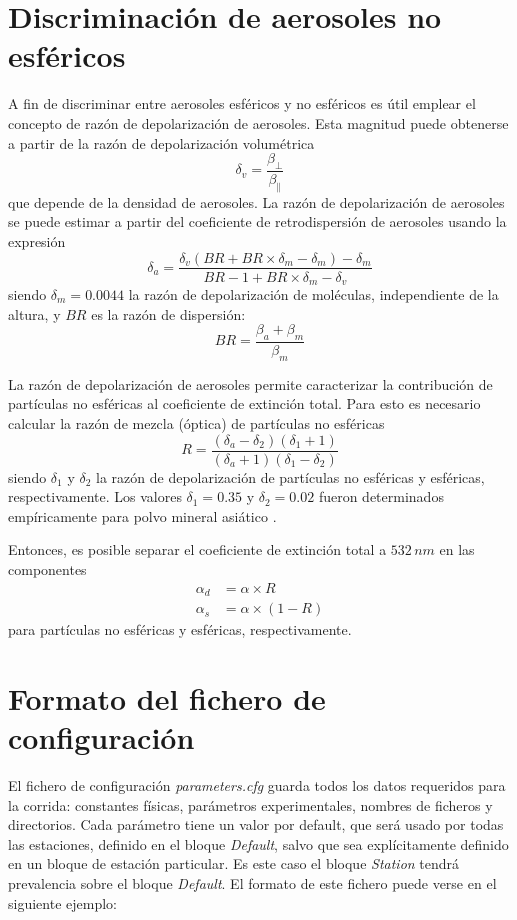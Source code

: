 \documentclass[12pt,a4paper,final]{report}
\begin{document}
	\chapter{Discriminación de aerosoles no esféricos}
	A fin de discriminar entre aerosoles esféricos y no esféricos es útil emplear el concepto de razón de depolarización de aerosoles. Esta magnitud puede obtenerse a partir de la razón de depolarización volumétrica
	\begin{equation}
	\delta_v = \dfrac{\beta_{\perp}}{\beta_{\parallel}}
	\end{equation}	
	que depende de la densidad de aerosoles. La razón de depolarización de aerosoles se puede estimar a partir del coeficiente de retrodispersión de aerosoles usando la expresión
	\begin{equation}
	\delta_a = \dfrac{\delta_v (BR + BR \times \delta_m - \delta_m) - \delta_m}{BR - 1 + BR \times \delta_m - \delta_v}
	\end{equation}
	siendo $\delta_m=0.0044$ la razón de depolarización de moléculas, independiente de la altura, y $BR$ es la razón de dispersión:
	\[ BR=\dfrac{\beta_a + \beta_m}{\beta_m} \]
	
	La razón de depolarización de aerosoles permite  caracterizar la contribución de partículas no esféricas al coeficiente de extinción total. Para esto es necesario calcular la razón de mezcla (óptica) de  partículas no esféricas
	\begin{equation}
	R = \dfrac{(\delta_a - \delta_2)(\delta_1+1)}{(\delta_a+1)(\delta_1 - \delta_2)}
	\end{equation}
	siendo $\delta_1$ y $\delta_2$ la razón de depolarización de partículas no esféricas y esféricas, respectivamente. Los valores $\delta_1=0.35$ y $\delta_2=0.02$ fueron determinados empíricamente para polvo mineral asiático \citep{shimizu2004}.
	
	Entonces, es posible separar el coeficiente de extinción total a $532 \, nm$ en las componentes
	\begin{align}
	\alpha_d &= \alpha \times R \\
	\alpha_s &= \alpha \times (1-R)	
	\end{align}
	para partículas no esféricas y esféricas, respectivamente.
    
    \appendix
    \chapter{Formato del fichero de configuración}
    \label{ch:appendix}
    El fichero de configuración \emph{parameters.cfg} guarda todos los datos requeridos para la corrida: constantes físicas, parámetros experimentales, nombres de ficheros y directorios. Cada parámetro tiene un valor por default, que será usado por todas las estaciones, definido en el bloque \emph{Default}, salvo que sea explícitamente definido en un bloque de estación particular. Es este caso el bloque \emph{Station} tendrá prevalencia sobre el bloque \emph{Default}. El formato de este fichero puede verse en el siguiente ejemplo:
   
\end{document}
